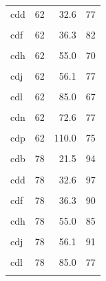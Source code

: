 \begin{longtable}[t]{lrrr}
cdd & 62 & 32.6 & 77\\
\cellcolor{gray!6}{cde} & \cellcolor{gray!6}{62} & \cellcolor{gray!6}{22.0} & \cellcolor{gray!6}{87}\\
cdf & 62 & 36.3 & 82\\
\cellcolor{gray!6}{cdg} & \cellcolor{gray!6}{62} & \cellcolor{gray!6}{44.0} & \cellcolor{gray!6}{75}\\
cdh & 62 & 55.0 & 70\\
\cellcolor{gray!6}{cdi} & \cellcolor{gray!6}{62} & \cellcolor{gray!6}{34.0} & \cellcolor{gray!6}{91}\\
cdj & 62 & 56.1 & 77\\
\cellcolor{gray!6}{cdk} & \cellcolor{gray!6}{62} & \cellcolor{gray!6}{68.0} & \cellcolor{gray!6}{72}\\
cdl & 62 & 85.0 & 67\\
\cellcolor{gray!6}{cdm} & \cellcolor{gray!6}{62} & \cellcolor{gray!6}{44.0} & \cellcolor{gray!6}{88}\\
cdn & 62 & 72.6 & 77\\
\cellcolor{gray!6}{cdo} & \cellcolor{gray!6}{62} & \cellcolor{gray!6}{88.0} & \cellcolor{gray!6}{74}\\
cdp & 62 & 110.0 & 75\\
\cellcolor{gray!6}{cda} & \cellcolor{gray!6}{78} & \cellcolor{gray!6}{13.0} & \cellcolor{gray!6}{87}\\
cdb & 78 & 21.5 & 94\\
\cellcolor{gray!6}{cdc} & \cellcolor{gray!6}{78} & \cellcolor{gray!6}{26.1} & \cellcolor{gray!6}{97}\\
cdd & 78 & 32.6 & 97\\
\cellcolor{gray!6}{cde} & \cellcolor{gray!6}{78} & \cellcolor{gray!6}{22.0} & \cellcolor{gray!6}{90}\\
cdf & 78 & 36.3 & 90\\
\cellcolor{gray!6}{cdg} & \cellcolor{gray!6}{78} & \cellcolor{gray!6}{44.0} & \cellcolor{gray!6}{88}\\
cdh & 78 & 55.0 & 85\\
\cellcolor{gray!6}{cdi} & \cellcolor{gray!6}{78} & \cellcolor{gray!6}{34.0} & \cellcolor{gray!6}{97}\\
cdj & 78 & 56.1 & 91\\
\cellcolor{gray!6}{cdk} & \cellcolor{gray!6}{78} & \cellcolor{gray!6}{68.0} & \cellcolor{gray!6}{84}\\
cdl & 78 & 85.0 & 77\\
\cellcolor{gray!6}{cdm} & \cellcolor{gray!6}{78} & \cellcolor{gray!6}{44.0} & \cellcolor{gray!6}{78}\\

\end{longtable}
